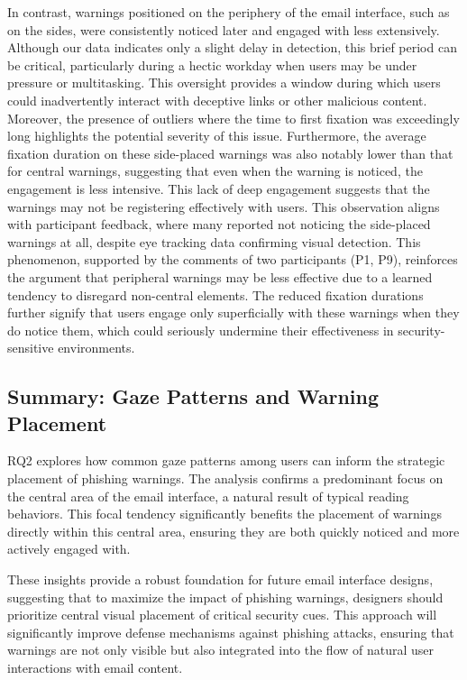 \documentclass[
  a4paper,  %
  twoside,  %
  bibliography=totoc,
  headsepline,
  cleardoublepage=empty,
  parskip=half,
  draft=false
]{scrbook}
\begin{document}
In contrast, warnings positioned on the periphery of the email interface, such as on the sides, were consistently noticed later and engaged with less extensively. Although our data indicates only a slight delay in detection, this brief period can be critical, particularly during a hectic workday when users may be under pressure or multitasking. This oversight provides a window during which users could inadvertently interact with deceptive links or other malicious content. Moreover, the presence of outliers where the time to first fixation was exceedingly long highlights the potential severity of this issue. \newline
Furthermore, the average fixation duration on these side-placed warnings was also notably lower than that for central warnings, suggesting that even when the warning is noticed, the engagement is less intensive. This lack of deep engagement suggests that the warnings may not be registering effectively with users. This observation aligns with participant feedback, where many reported not noticing the side-placed warnings at all, despite eye tracking data confirming visual detection. \newline
This phenomenon, supported by the comments of two participants (P1, P9), reinforces the argument that peripheral warnings may be less effective due to a learned tendency to disregard non-central elements. The reduced fixation durations further signify that users engage only superficially with these warnings when they do notice them, which could seriously undermine their effectiveness in security-sensitive environments.

\subsection{Summary: Gaze Patterns and Warning Placement}

RQ2 explores how common gaze patterns among users can inform the strategic placement of phishing warnings. The analysis confirms a predominant focus on the central area of the email interface, a natural result of typical reading behaviors. This focal tendency significantly benefits the placement of warnings directly within this central area, ensuring they are both quickly noticed and more actively engaged with.

These insights provide a robust foundation for future email interface designs, suggesting that to maximize the impact of phishing warnings, designers should prioritize central visual placement of critical security cues. This approach will significantly improve defense mechanisms against phishing attacks, ensuring that warnings are not only visible but also integrated into the flow of natural user interactions with email content.
\end{document}
